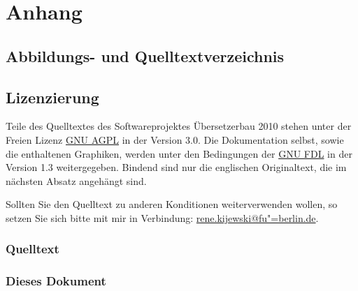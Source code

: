 \documentclass[10pt,a4paper,ngerman,titlepage,tocindentauto]{scrartcl}
\begin{document}
	\section{Anhang}
		\subsection{Abbildungs- und Quelltextverzeichnis}
			\listoffigures
			\lstlistoflistings
		
		\subsection{Lizenzierung}
			Teile des Quelltextes des Softwareprojektes Übersetzerbau 2010 stehen unter der Freien
			Lizenz \href{http://www.gnu.org/licenses/agpl-3.0.html}{GNU AGPL} in der Version 3.0.
			Die Dokumentation selbst, sowie die enthaltenen Graphiken, werden unter den Bedingungen
			der \href{http://www.gnu.org/licenses/fdl-1.3.html}{GNU FDL} in der Version 1.3 weitergegeben.
			Bindend sind nur die englischen Originaltext, die im nächsten Absatz angehängt sind.
			
			Sollten Sie den Quelltext zu anderen Konditionen weiterverwenden wollen, so setzen Sie
			sich bitte mit mir in Verbindung:
			\href{mailto:rene.kijewski@fu-berlin.de?subject=[SWP_CP_2010]}{rene.kijewski@fu"=berlin.de}.
			
			\subsubsection{Quelltext}
				\begin{multicols}{3}
					{\tiny}
				\end{multicols}
			
			\subsubsection[Dieses Dokument]{Dieses Dokument}
				\begin{multicols}{3}
					{\tiny}
				\end{multicols}
\end{document}
